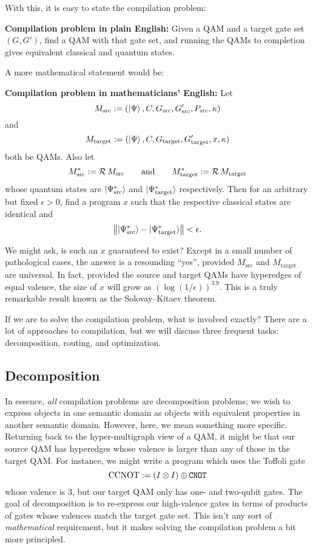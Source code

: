 With this, it is easy to state the compilation problem:
\begin{framed}
\noindent \textbf{Compilation problem in plain English:} Given a QAM and a target gate set $(G, G')$, find a QAM with that gate set, and running the QAMs to completion gives equivalent classical and quantum states.
\end{framed}
\noindent A more mathematical statement would be:
\begin{framed}
\noindent \textbf{Compilation problem in mathematicians' English:} Let \[M_{\textrm{src}} := (\ket{\Psi}, C, G_{\textrm{src}}, G'_{\textrm{src}}, P_{\textrm{src}}, \kappa)\] and \[M_{\textrm{target}} := (\ket{\Psi}, C, G_{\textrm{target}}, G'_{\textrm{target}}, x, \kappa)\] both be QAMs. Also let
\begin{displaymath}
M^*_{\textrm{src}} := \operatorname{\mathcal{R}} M_{\textrm{src}}\qquad\text{and}\qquad
M^*_{\textrm{target}} := \operatorname{\mathcal{R}} M_{\textrm{target}}
\end{displaymath}
whose quantum states are $\ket{\Psi^*_{\textrm{src}}}$ and $\ket{\Psi^*_{\textrm{target}}}$ respectively. Then for an arbitrary but fixed $\epsilon>0$, find a program $x$ such that the respective classical states are identical and
\begin{displaymath}
\left\Vert\ket{\Psi^*_{\textrm{src}}} - \ket{\Psi^*_{\textrm{target}}}\right\Vert < \epsilon.
\end{displaymath}
\end{framed}

We might ask, is such an $x$ guaranteed to exist? Except in a small number of pathological cases, the answer is a resounding ``yes'', provided $M_{\textrm{src}}$ and $M_{\textrm{target}}$ are universal. In fact, provided the source and target QAMs have hyperedges of equal valence, the size of $x$ will grow as $(\log (1/\epsilon))^{3.9}$. This is a truly remarkable result known as the Solovay--Kitaev theorem.

If we are to solve the compilation problem, what is involved exactly? There are a lot of approaches to compilation, but we will discuss three frequent tasks: decomposition, routing, and optimization.

\subsection{Decomposition}
In essence, \emph{all} compilation problems are decomposition problems; we wish to express objects in one semantic domain as objects with equivalent properties in another semantic domain. However, here, we mean something more specific. Returning back to the hyper-multigraph view of a QAM, it might be that our source QAM has hyperedges whose valence is larger than any of those in the target QAM. For instance, we might write a program which uses the Toffoli gate \[\textrm{CCNOT} := (I \otimes I) \oplus \mathtt{CNOT}{}\] whose valence is $3$, but our target QAM only has one- and two-qubit gates. The goal of decomposition is to re-express our high-valence gates in terms of products of gates whose valences match the target gate set. This isn't any sort of \emph{mathematical} requirement, but it makes solving the compilation problem a bit more principled.

